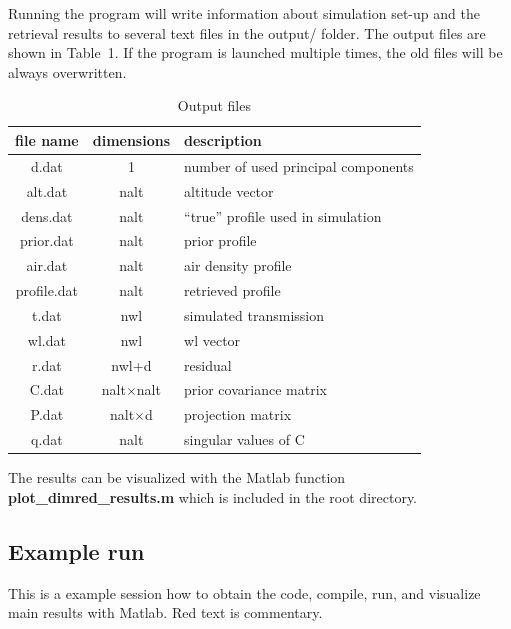 \documentclass[12pt,a4paper]{article}
\begin{document}
Running the program will write information about simulation set-up and the retrieval results to several 
text files in the output/ folder. The output files are shown in Table~1. If the program is launched multiple 
times, the old files will be always overwritten.
\begin{table}[h!]
\begin{center}
\begin{tabular}{c | c | l}
file name & dimensions & description \\
\hline
d.dat & 1 & number of used principal components \\ 
alt.dat & nalt & altitude vector \\
dens.dat & nalt & ``true'' profile used in simulation \\
prior.dat & nalt & prior profile \\
air.dat & nalt & air density profile \\
profile.dat & nalt& retrieved profile \\
t.dat & nwl & simulated transmission \\
wl.dat & nwl & wl vector \\
r.dat & nwl+d & residual \\
C.dat &nalt$\times$nalt & prior covariance matrix \\
P.dat & nalt$\times$d & projection matrix\\
q.dat & nalt & singular values of C \\
\hline
\end{tabular}
\caption{Output files}
\end{center}
\end{table}
The results can be visualized with the Matlab function \textbf{plot\_dimred\_results.m} which is included in the root directory.

\subsection{Example run}

This is a example session how to obtain the code, compile, run, and visualize main results with Matlab. Red text is commentary.
\end{document}
